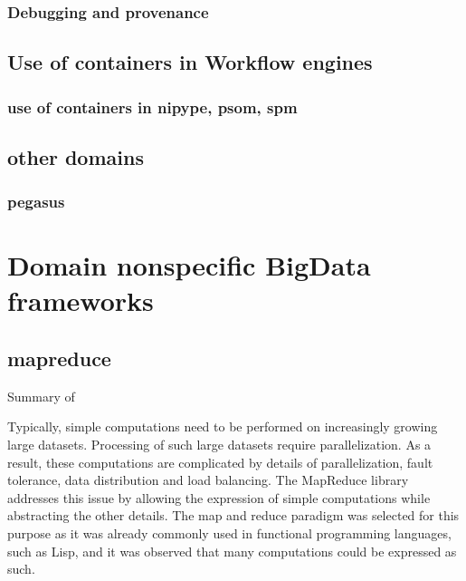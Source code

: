 \documentclass{report}
\begin{document}
        \subsection{Debugging and provenance} 
    \section{Use of containers in Workflow engines} 
        \subsection{use of containers in nipype, psom, spm}
        
       \section{other domains}
       	\subsection{pegasus}
		
\chapter{Domain nonspecific BigData frameworks} 
    \section{mapreduce}
        Summary of ~\cite{mapred}

        Typically, simple computations need to be performed on 
        increasingly growing large datasets. Processing of such 
        large datasets require parallelization. As a result, 
        these computations are complicated by details of 
        parallelization, fault tolerance, data distribution and 
        load balancing. The MapReduce library addresses this issue 
        by allowing the expression of simple computations while 
        abstracting the other details. The map and reduce paradigm 
        was selected for this purpose as it was already commonly 
        used in functional programming languages, such as Lisp, and 
        it was observed that many computations could be expressed 
        as such.
\end{document}
